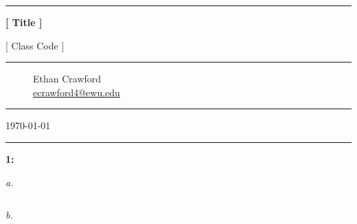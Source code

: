 \documentclass[]{article}
\begin{document}
\begin{titlepage}
    \centering

    \vspace*{1cm}

    \rule{.7\textwidth}{1pt}

    \vspace{.7\baselineskip}
    {\huge \textbf{[ Title ]}}

    \vspace*{.5cm}
    {\Large [ Class Code ]}
    
    \rule{.7\textwidth}{1pt}

    \vspace{1cm}

    \large

    \begin{figure}[!ht]
        \large
        \centering
        Ethan Crawford \\
        {\normalsize \url{ecrawford4@ewu.edu}}
    \end{figure}


    \vspace{3cm}


    \vfill

    \rule{.7\textwidth}{1pt}

    \vspace*{.25cm}

    \Large \today

    \rule{.7\textwidth}{1pt}

\end{titlepage}

\noindent\textbf{1:}

\vspace{5mm}\textit{a.}

\begin{lstlisting}
\end{lstlisting}

\vspace{5mm}\textit{b.}
\end{document}

